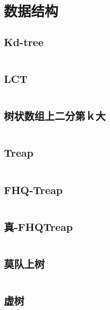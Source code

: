 \chapter{数据结构}
\section{Kd-tree}
\inputminted{cpp}{\source/data-structure/Kd-tree.cpp}
\section{LCT}
\inputminted{cpp}{\source/data-structure/LCT.cpp}
\section{树状数组上二分第ｋ大}
\inputminted{cpp}{\source/data-structure/fenwicktree_kth.cpp}
\section{Treap}
\inputminted{cpp}{\source/data-structure/Treap.cpp}
\section{FHQ-Treap}
\inputminted{cpp}{\source/data-structure/fhqTreap.cpp}
\section{真-FHQTreap}
\inputminted{cpp}{\source/data-structure/true.fhqtreap.cpp}
\section{莫队上树}
\inputminted{cpp}{\source/data-structure/mo-team-on-tree.cpp}
\section{虚树}
\inputminted{cpp}{\source/data-structure/virtual-tree.cpp}